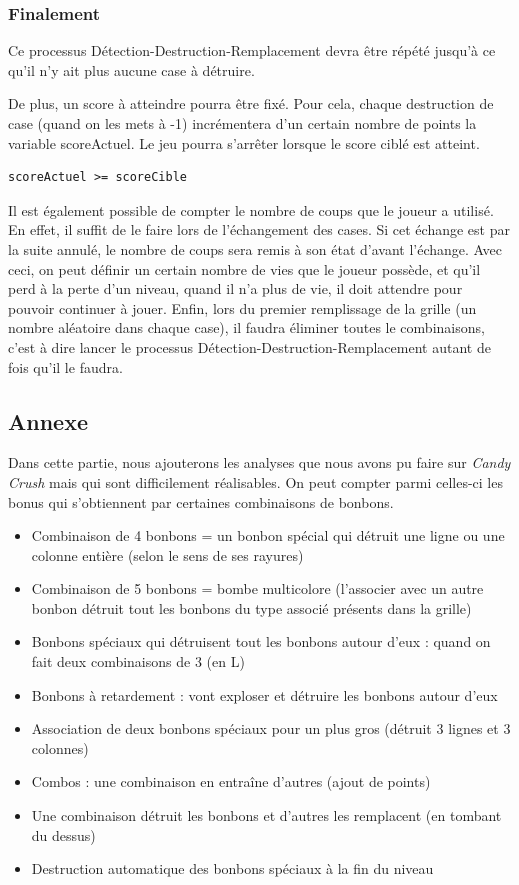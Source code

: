 \subsubsection{Finalement}

Ce processus Détection-Destruction-Remplacement devra être répété jusqu'à ce qu'il n'y ait plus aucune case à détruire.

De plus, un score à atteindre pourra être fixé. Pour cela, chaque destruction de case (quand on les mets à -1) incrémentera d'un certain nombre de points la variable scoreActuel. Le jeu pourra s'arrêter lorsque le score ciblé est atteint.
\begin{lstlisting}
scoreActuel >= scoreCible
\end{lstlisting}

Il est également possible de compter le nombre de coups que le joueur a utilisé. En effet, il suffit de le faire lors de l'échangement des cases. Si cet échange est par la suite annulé, le nombre de coups sera remis à son état d'avant l'échange.
Avec ceci, on peut définir un certain nombre de vies que le joueur possède, et qu'il perd à la perte d'un niveau, quand il n'a plus de vie, il doit attendre pour pouvoir continuer à jouer.
Enfin, lors du premier remplissage de la grille (un nombre aléatoire dans chaque case), il faudra éliminer toutes le combinaisons, c'est à dire lancer le processus Détection-Destruction-Remplacement autant de fois qu'il le faudra.

\subsection{Annexe}
Dans cette partie, nous ajouterons les analyses que nous avons pu faire sur \emph{Candy Crush} mais qui sont difficilement réalisables.
On peut compter parmi celles-ci les bonus qui s'obtiennent par certaines combinaisons de bonbons.
\begin{itemize}

\item
	Combinaison de 4 bonbons = un bonbon spécial qui détruit une ligne ou une colonne entière (selon le sens de ses rayures)

\item
	Combinaison de 5 bonbons = bombe multicolore (l'associer avec un autre bonbon détruit tout les bonbons du type associé présents dans la grille)
\item
	Bonbons spéciaux qui détruisent tout les bonbons autour d'eux : quand on fait deux combinaisons de 3 (en L)
\item
	Bonbons à retardement : vont exploser et détruire les bonbons autour d'eux 
\item
	Association de deux bonbons spéciaux pour un plus gros (détruit 3 lignes et 3 colonnes)      
\item
	Combos : une combinaison en entraîne d'autres (ajout de points)
\item
	Une combinaison détruit les bonbons et d'autres les remplacent (en tombant du dessus) %
\item
	Destruction automatique des bonbons spéciaux à la fin du niveau

\end{itemize}
